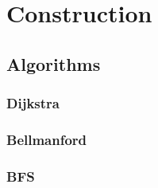 \section{Construction}









\subsection{Algorithms}
\subsubsection{Dijkstra}
\subsubsection{Bellmanford}
\subsubsection{BFS}







